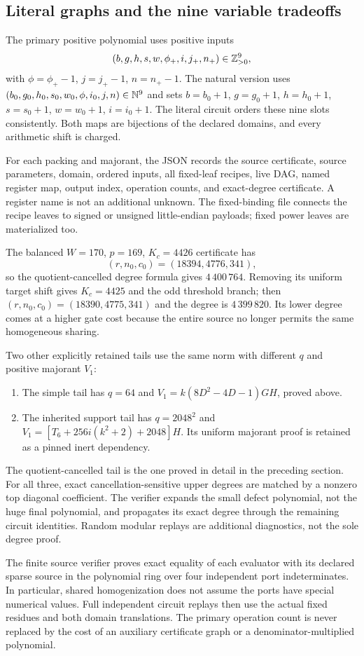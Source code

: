 \subsection{Literal graphs and the nine variable tradeoffs}
The primary positive polynomial uses positive inputs
\[
 (b,g,h,s,w,\phi_+,i,j_+,n_+)\in\mathbb Z_{>0}^9,
\]
with $\phi=\phi_+-1$, $j=j_+-1$, $n=n_+-1$. The natural version uses
$(b_0,g_0,h_0,s_0,w_0,\phi,i_0,j,n)\in\mathbb N^9$ and sets
$b=b_0+1$, $g=g_0+1$, $h=h_0+1$, $s=s_0+1$, $w=w_0+1$, $i=i_0+1$.
The literal circuit orders these nine slots consistently. Both maps are
bijections of the declared domains, and every arithmetic shift is charged.

For each packing and majorant, the JSON records the source certificate,
source parameters, domain, ordered inputs, all fixed-leaf recipes, live DAG,
named register map, output index, operation counts, and exact-degree
certificate. A register name is not an additional unknown.
The fixed-binding file connects the recipe leaves to signed or unsigned
little-endian payloads; fixed power leaves are materialized too.

The balanced $W=170$, $p=169$, $K_c=4426$ certificate has
\[
 (r,n_0,c_0)=(18394,4776,341),
\]
so the quotient-cancelled degree formula gives $4\,400\,764$.
Removing its uniform target shift gives $K_c=4425$ and the odd threshold
branch; then $(r,n_0,c_0)=(18390,4775,341)$ and the degree is
$4\,399\,820$. Its lower degree comes at a higher gate cost because the
entire source no longer permits the same homogeneous sharing.

Two other explicitly retained tails use the same norm with different
$q$ and positive majorant $V_1$:
\begin{enumerate}
\item The simple tail has $q=64$ and
$V_1=k(8D^2-4D-1)GH$, proved above.
\item The inherited support tail has $q=2048^2$ and
$V_1=[T_6+256i(k^2+2)+2048]H$.
Its uniform majorant proof is retained as a pinned inert dependency.
\end{enumerate}
The quotient-cancelled tail is the one proved in detail in the preceding
section. For all three, exact cancellation-sensitive upper degrees are
matched by a nonzero top diagonal coefficient. The verifier expands the
small defect polynomial, not the huge final polynomial, and propagates
its exact degree through the remaining circuit identities. Random modular
replays are additional diagnostics, not the sole degree proof.

The finite source verifier proves exact equality of each evaluator with
its declared sparse source in the polynomial ring over four independent
port indeterminates. In particular, shared homogenization does not assume
the ports have special numerical values. Full independent circuit replays
then use the actual fixed residues and both domain translations.
The primary operation count is never replaced by the cost of an auxiliary
certificate graph or a denominator-multiplied polynomial.
